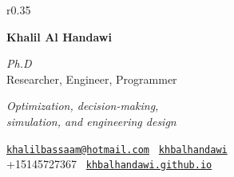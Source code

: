 \documentclass[10pt, oneside, final]{article}
\begin{document}
  \thispagestyle{empty}
  
  \begin{wrapfigure}{r}{0.35\textwidth}
  
  \end{wrapfigure}

  {\large\textsf{\textbf{Khalil Al Handawi}}}

  \textit{Ph.D} \\
  {Researcher, Engineer, Programmer}

  \emph{Optimization, decision-making, \\ simulation, and engineering design}

  \vfill 
  {\faEnvelope} \texttt{\href{mailto:khalilbassaam@hotmail.com}{khalilbassaam@hotmail.com}} \hfill 
  {\faGithub} \texttt{ \href{https://github.com/khbalhandawi}{khbalhandawi}} \\
  {\faPhone} {+1{\textendash}514{\textendash}572{\textendash}7367 \hfill}
  {\faGlobe} \texttt{ \href{https://khbalhandawi.github.io/}{khbalhandawi.github.io}}
  
\end{document}
